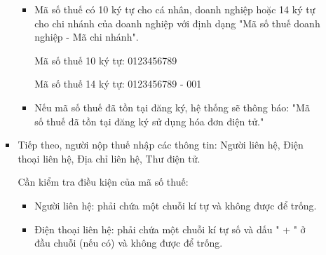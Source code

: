 \begin{itemize}
\begin{itemize}
\begin{itemize}
\begin{note}
                                  \begin{itemize}

                                      \item Mã số thuế có 10 ký tự cho cá nhân, doanh nghiệp hoặc 14 ký tự cho chi nhánh của doanh nghiệp với định dạng "Mã số thuế doanh nghiệp - Mã chi nhánh".

                                            \begin{example}

                                                Mã số thuế 10 ký tự: 0123456789

                                                Mã số thuế 14 ký tự: 0123456789 - 001

                                            \end{example}


                                      \item Nếu mã số thuế đã tồn tại đăng ký, hệ thống sẽ thông báo: "Mã số thuế đã tồn tại đăng ký sử dụng hóa đơn điện tử."


                                  \end{itemize}

                              \end{note}

                        \item Tiếp theo, người nộp thuế nhập các thông tin: Người liên hệ, Điện thoại liên hệ, Địa chỉ liên hệ, Thư điện tử.

                              \begin{note} Cần kiểm tra điều kiện của mã số thuế:

                                  \begin{itemize}

                                      \item Người liên hệ: phải chứa một chuỗi kí tự và không được để trống.


                                      \item Điện thoại liên hệ: phải chứa một chuỗi kí tự số và dấu " + " ở đầu chuỗi (nếu có) và không được để trống.


\end{itemize}
\end{note}
\end{itemize}
\end{itemize}
\end{itemize}
